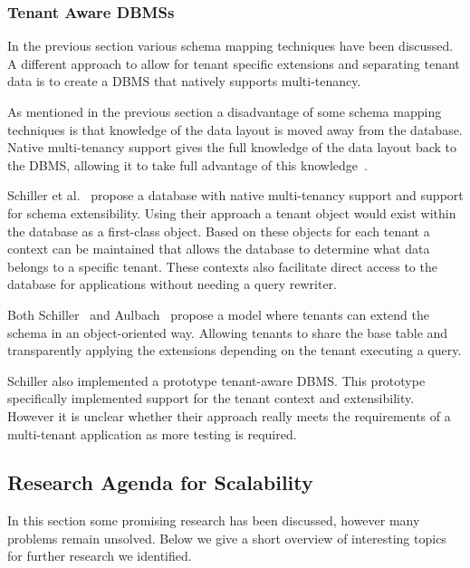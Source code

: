 \subsubsection{Tenant Aware \acp{DBMS}}
In the previous section various schema mapping techniques have been discussed.
A different approach to allow for tenant specific extensions and separating tenant data is to create a \ac{DBMS} that natively supports multi-tenancy.

As mentioned in the previous section a disadvantage of some schema mapping techniques is that knowledge of the data layout is moved away from the database.
Native multi-tenancy support gives the full knowledge of the data layout back to the \ac{DBMS}, allowing it to take full advantage of this knowledge~\cite{schiller2011native}.

Schiller et al.~\cite{schiller2011native} propose a database with native multi-tenancy support and support for schema extensibility.
Using their approach a tenant object would exist within the database as a first-class object. 
Based on these objects for each tenant a context can be maintained that allows the database to determine what data belongs to a specific tenant. 
These contexts also facilitate direct access to the database for applications without needing a query rewriter.

Both Schiller~\cite{schiller2011native} and Aulbach~\cite{aulbach2011extensibility} propose a model where tenants can extend the schema in an object-oriented way.
Allowing tenants to share the base table and transparently applying the extensions depending on the tenant executing a query.

Schiller also implemented a prototype tenant-aware \ac{DBMS}.
This prototype specifically implemented support for the tenant context and extensibility.
However it is unclear whether their approach really meets the requirements of a multi-tenant application as more testing is required.


\subsection{Research Agenda for Scalability}
In this section some promising research has been discussed, however many problems remain unsolved.
Below we give a short overview of interesting topics for further research we identified.

